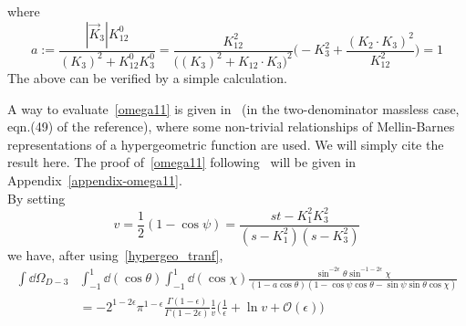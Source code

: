 where 
\begin{equation}
a := \frac{|\vec{K}_3|K_{12}^0}{(K_3)^2 + K_{12}^0 K_3^0}
= \frac{K_{12}^2}{\big((K_3)^2 + K_{12}\cdot K_3\big)^2}\Big( -K_3^2 + \frac{(K_2\cdot K_3)^2}{K_{12}^2}\Big)
=1
\end{equation}
The above can be verified by a simple calculation.
\iffalse
This can be verified by computing
\begin{equation}
\begin{split}
1-a^2 = &
\frac{1}{\big((K_3)^2 + K_{12}\cdot K_3\big)^2}
\Big( \big( (K_3)^2 + K_{12}\cdot K_3 \big)^2 + K_3K_{12} - (K_3\cdot K_{12})^2
\Big)
\\
= &
\frac{1}{(K_3\cdot K_4)^2} \Big( (K_3\cdot K_4)^2 + K_3^2K_{12}^2 - (K_3^2 + K_3\cdot K_4)^2 \Big)
\\
= &
\frac{K_3^2}{(K_3\cdot K_4)^2}\Big(-K_{34}^2 + K_{12}^2\Big)
\\
= & 0
\end{split}
\end{equation}
and $a>0$.
\fi
A way to evaluate~\cref{omega11} is given in~\cite{Somogyi:2011ir} (in the two-denominator massless case, eqn.(49) of the reference), where some non-trivial relationships of Mellin-Barnes representations of a hypergeometric function are used.
We will simply cite the result here.
The proof of~\cref{omega11} following~\cite{Somogyi:2011ir} will be given in Appendix~\ref{appendix-omega11}.
\\
By setting
\begin{equation}
v = \frac{1}{2}(1-\cos\psi) =\frac{st - K_1^2K_3^2}{(s-K_1^2)(s-K_3^2)}
\end{equation}
we have, after using~\cref{hypergeo_tranf}, 
\begin{equation}\label{omega11}
\begin{split}
 \int \dd \Omega_{D-3} &
\int_{-1}^1 \dd(\cos\theta)\int_{-1}^1\dd(\cos \chi)\frac{\sin^{-2\epsilon}\theta \sin^{-1-2\epsilon}\chi}{(1-a\cos\theta)(1-\cos\psi\cos\theta  - \sin\psi\sin\theta\cos\chi)}
\\
& = 
-2^{1-2\epsilon}\pi^{1-\epsilon} \frac{\Gamma(1-\epsilon)}{\Gamma(1-2\epsilon)}\frac{1}{v}\Big(\frac{1}{\epsilon}
+\ln v + \mathcal{O}(\epsilon)\Big)
\end{split}
\end{equation}
